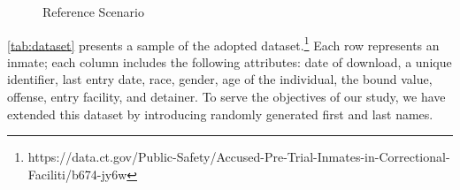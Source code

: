 \begin{figure}[ht!]
  \caption{Reference Scenario}
  \label{fig:reference_scenario}
\end{figure}

\cref{tab:dataset} presents a sample of the adopted dataset.\footnote{https://data.ct.gov/Public-Safety/Accused-Pre-Trial-Inmates-in-Correctional-Faciliti/b674-jy6w}
Each row represents an inmate; each column includes the following attributes: date of download, a unique identifier, last entry date, race, gender, age of the individual, the bound value, offense, entry facility, and detainer.
To serve the objectives of our study, we have extended this dataset by introducing randomly generated first and last names.


